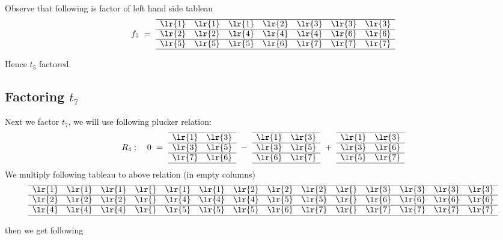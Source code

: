 Observe that following is factor of left hand side tableau 
\[
f_5\ =\ 
\begin{array}[c]{*{7}c}\cline{1-7}
\lr{1}&\lr{1}&\lr{1}&\lr{2}&\lr{3}&\lr{3}&\lr{3}\\\cline{1-7}
\lr{2}&\lr{2}&\lr{4}&\lr{4}&\lr{4}&\lr{6}&\lr{6}\\\cline{1-7}
\lr{5}&\lr{5}&\lr{5}&\lr{6}&\lr{7}&\lr{7}&\lr{7}\\\cline{1-7}
\end{array}
\]

Hence \(t_5\) factored.

\subsection{Factoring \(t_7\)}
Next we factor \(t_7\), we will use following plucker relation:
\[
R_4:\ \ \ 0\ =\ 
\begin{array}[c]{*{2}c}\cline{1-2}
\lr{1}&\lr{3}\\\cline{1-2}
\lr{3}&\lr{5}\\\cline{1-2}
\lr{7}&\lr{6}\\\cline{1-2}
\end{array}
\ -\ 
\begin{array}[c]{*{2}c}\cline{1-2}
\lr{1}&\lr{3}\\\cline{1-2}
\lr{3}&\lr{5}\\\cline{1-2}
\lr{6}&\lr{7}\\\cline{1-2}
\end{array}
\ +\ 
\begin{array}[c]{*{2}c}\cline{1-2}
\lr{1}&\lr{3}\\\cline{1-2}
\lr{3}&\lr{6}\\\cline{1-2}
\lr{5}&\lr{7}\\\cline{1-2}
\end{array}
\]
We multiply following tableau to above relation (in empty columns)
\[
\begin{array}[b]{*{14}c}\cline{1-14}
\lr{1}&\lr{1}&\lr{1}&\lr{}&\lr{1}&\lr{1}&\lr{2}&\lr{2}&\lr{2}&\lr{}&\lr{3}&\lr{3}&\lr{3}&\lr{3}\\\cline{1-14}
\lr{2}&\lr{2}&\lr{2}&\lr{}&\lr{4}&\lr{4}&\lr{4}&\lr{5}&\lr{5}&\lr{}&\lr{6}&\lr{6}&\lr{6}&\lr{6}\\\cline{1-14}
\lr{4}&\lr{4}&\lr{4}&\lr{}&\lr{5}&\lr{5}&\lr{5}&\lr{6}&\lr{7}&\lr{}&\lr{7}&\lr{7}&\lr{7}&\lr{7}\\\cline{1-14}
\end{array}
\]
then we get following
